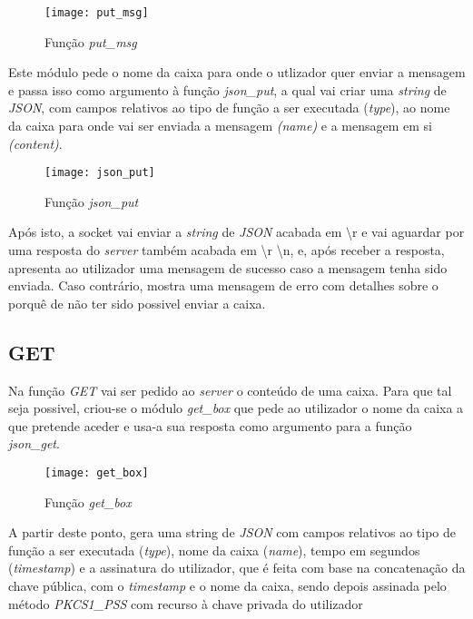 \documentclass{report}
\begin{document}
\begin{figure}[h]
\center
\texttt{[image: put\_msg]}
\caption{Função \textit{put\_msg}}
\label{fig:put_msg}
\end{figure}

Este módulo pede o nome da caixa para onde o utlizador quer enviar a mensagem e passa isso como argumento à função \textit{json\_put}, a qual vai criar uma \textit{string} de \textit{JSON}, com campos relativos ao tipo de função a ser executada (\textit{type}), ao nome da caixa para onde vai ser enviada a mensagem \textit{(name)} e a mensagem em si \textit{(content)}. 

\begin{figure}[h]
\center
\texttt{[image: json\_put]}
\caption{Função \textit{json\_put}}
\label{fig:json_put}
\end{figure}

Após isto, a socket vai enviar a \textit{string} de \textit{JSON} acabada em \textbackslash r \textbackslashn e vai aguardar por uma resposta do \textit{server} também acabada em \textbackslash r \textbackslash n, e, após receber a resposta, apresenta ao utilizador uma mensagem de sucesso caso a mensagem tenha sido enviada. Caso contrário, mostra uma mensagem de erro com detalhes sobre o porquê de não ter sido possivel enviar a caixa.

\newpage
\FloatBarrier
\subsection{GET}
Na função \textit{GET} vai ser pedido ao \textit{server} o conteúdo de uma caixa. Para que tal seja possivel, criou-se o módulo \textit{get\_box} que pede ao utilizador o nome da caixa a que pretende aceder e usa-a sua resposta como argumento para a função \textit{json\_get}.

\begin{figure}[h]
\center
\texttt{[image: get\_box]}
\caption{Função \textit{get\_box}}
\label{fig:get_box}
\end{figure}

A partir deste ponto, gera uma string de \textit{JSON} com campos relativos ao tipo de função a ser executada (\textit{type}), nome da caixa (\textit{name}), tempo em segundos (\textit{timestamp}) e a assinatura do utilizador, que é feita com base na concatenação da chave pública, com o \textit{timestamp} e o nome da caixa, sendo depois assinada pelo método \textit{PKCS1\_PSS} com recurso à chave privada do utilizador
\end{document}
